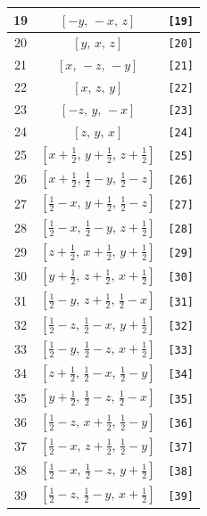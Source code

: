 \documentclass[fleqn,8pt]{jsarticle}
\begin{document}
\begin{longtable}{ccc}
19 & $\left[ - y,\, - x,\, z \right]$ & {\tt [19]} \\ \hline
20 & $\left[ y,\, x,\, z \right]$ & {\tt [20]} \\ \hline
21 & $\left[ x,\, - z,\, - y \right]$ & {\tt [21]} \\ \hline
22 & $\left[ x,\, z,\, y \right]$ & {\tt [22]} \\ \hline
23 & $\left[ - z,\, y,\, - x \right]$ & {\tt [23]} \\ \hline
24 & $\left[ z,\, y,\, x \right]$ & {\tt [24]} \\ \hline
25 & $\left[ x + \frac{1}{2},\, y + \frac{1}{2},\, z + \frac{1}{2} \right]$ & {\tt [25]} \\ \hline
26 & $\left[ x + \frac{1}{2},\, \frac{1}{2} - y,\, \frac{1}{2} - z \right]$ & {\tt [26]} \\ \hline
27 & $\left[ \frac{1}{2} - x,\, y + \frac{1}{2},\, \frac{1}{2} - z \right]$ & {\tt [27]} \\ \hline
28 & $\left[ \frac{1}{2} - x,\, \frac{1}{2} - y,\, z + \frac{1}{2} \right]$ & {\tt [28]} \\ \hline
29 & $\left[ z + \frac{1}{2},\, x + \frac{1}{2},\, y + \frac{1}{2} \right]$ & {\tt [29]} \\ \hline
30 & $\left[ y + \frac{1}{2},\, z + \frac{1}{2},\, x + \frac{1}{2} \right]$ & {\tt [30]} \\ \hline
31 & $\left[ \frac{1}{2} - y,\, z + \frac{1}{2},\, \frac{1}{2} - x \right]$ & {\tt [31]} \\ \hline
32 & $\left[ \frac{1}{2} - z,\, \frac{1}{2} - x,\, y + \frac{1}{2} \right]$ & {\tt [32]} \\ \hline
33 & $\left[ \frac{1}{2} - y,\, \frac{1}{2} - z,\, x + \frac{1}{2} \right]$ & {\tt [33]} \\ \hline
34 & $\left[ z + \frac{1}{2},\, \frac{1}{2} - x,\, \frac{1}{2} - y \right]$ & {\tt [34]} \\ \hline
35 & $\left[ y + \frac{1}{2},\, \frac{1}{2} - z,\, \frac{1}{2} - x \right]$ & {\tt [35]} \\ \hline
36 & $\left[ \frac{1}{2} - z,\, x + \frac{1}{2},\, \frac{1}{2} - y \right]$ & {\tt [36]} \\ \hline
37 & $\left[ \frac{1}{2} - x,\, z + \frac{1}{2},\, \frac{1}{2} - y \right]$ & {\tt [37]} \\ \hline
38 & $\left[ \frac{1}{2} - x,\, \frac{1}{2} - z,\, y + \frac{1}{2} \right]$ & {\tt [38]} \\ \hline
39 & $\left[ \frac{1}{2} - z,\, \frac{1}{2} - y,\, x + \frac{1}{2} \right]$ & {\tt [39]} \\ \hline

\end{longtable}
\end{document}
